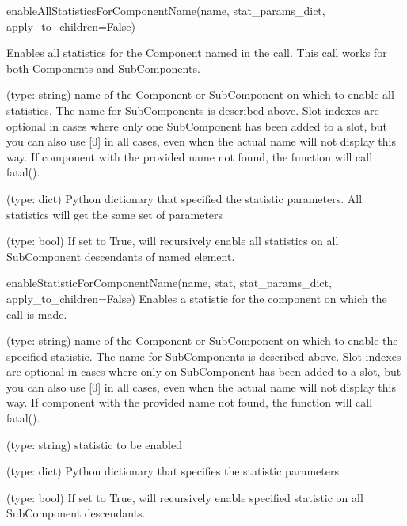 \begin{functiondoc}{enableAllStatisticsForComponentName(name, stat_params_dict,
    apply_to_children=False)}{

    Enables all statistics for the Component named in the call.  This
    call works for both Components and SubComponents.
}

   (type: string) name of the Component or SubComponent on
  which to enable all statistics.  The name for SubComponents is
  described above.  Slot indexes are optional in cases where only one
  SubComponent has been added to a slot, but you can also use [0] in
  all cases, even when the actual name will not display this way.  If
  component with the provided name not found, the function will call
  fatal().

   (type: dict) Python dictionary that
  specified the statistic parameters.  All statistics will get the
  same set of parameters

   (type: bool) If set to True, will
  recursively enable all statistics on all SubComponent descendants of
  named element.

  \noreturn
\end{functiondoc}


\begin{functiondoc}{enableStatisticForComponentName(name, stat, stat_params_dict, apply_to_children=False)}{
  Enables a statistic for the component on which the call is made.
}

   (type: string) name of the Component or SubComponent on
  which to enable the specified statistic.  The name for SubComponents
  is described above.  Slot indexes are optional in cases where only
  on SubComponent has been added to a slot, but you can also use [0]
  in all cases, even when the actual name will not display this
  way. If component with the provided name not found, the function
  will call fatal().

   (type: string) statistic to be enabled

   (type: dict) Python dictionary that
  specifies the statistic parameters

   (type: bool) If set to True, will
  recursively enable specified statistic on all SubComponent
  descendants.

  \noreturn
\end{functiondoc}


